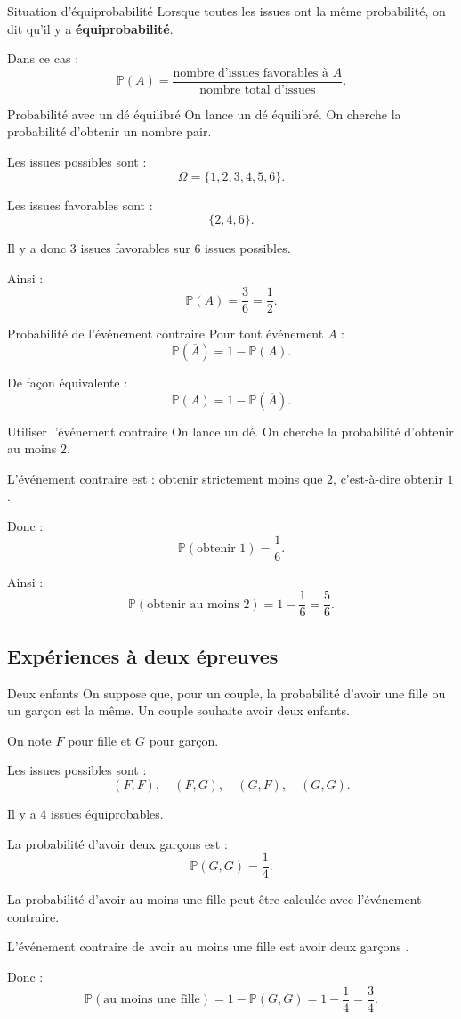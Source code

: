 \documentclass[11pt,a4paper]{article}
\newcommand{\Prob}{\mathbb{P}}
\begin{document}
\begin{propositionbox}{Situation d'équiprobabilité}
Lorsque toutes les issues ont la même probabilité, on dit qu'il y a \textbf{équiprobabilité}.

Dans ce cas :
\[
\Prob(A)=\frac{\text{nombre d'issues favorables à }A}{\text{nombre total d'issues}}.
\]
\end{propositionbox}

\begin{examplebox}{Probabilité avec un dé équilibré}
On lance un dé équilibré. On cherche la probabilité d'obtenir un nombre pair.

Les issues possibles sont :
\[
\Omega=\{1,2,3,4,5,6\}.
\]

Les issues favorables sont :
\[
\{2,4,6\}.
\]

Il y a donc $3$ issues favorables sur $6$ issues possibles.

Ainsi :
\[
\Prob(A)=\frac{3}{6}=\frac{1}{2}.
\]
\end{examplebox}

\begin{propositionbox}{Probabilité de l'événement contraire}
Pour tout événement $A$ :
\[
\Prob(\overline{A})=1-\Prob(A).
\]

De façon équivalente :
\[
\Prob(A)=1-\Prob(\overline{A}).
\]
\end{propositionbox}

\begin{examplebox}{Utiliser l'événement contraire}
On lance un dé. On cherche la probabilité d'obtenir au moins $2$.

L'événement contraire est : obtenir strictement moins que $2$, c'est-à-dire obtenir $1$.

Donc :
\[
\Prob(\text{obtenir }1)=\frac{1}{6}.
\]

Ainsi :
\[
\Prob(\text{obtenir au moins }2)=1-\frac{1}{6}=\frac{5}{6}.
\]
\end{examplebox}

\subsection{Expériences à deux épreuves}

\begin{examplebox}{Deux enfants}
On suppose que, pour un couple, la probabilité d'avoir une fille ou un garçon est la même. Un couple souhaite avoir deux enfants.

On note $F$ pour fille et $G$ pour garçon.

Les issues possibles sont :
\[
(F,F),\quad (F,G),\quad (G,F),\quad (G,G).
\]

Il y a $4$ issues équiprobables.

La probabilité d'avoir deux garçons est :
\[
\Prob(G,G)=\frac{1}{4}.
\]

La probabilité d'avoir au moins une fille peut être calculée avec l'événement contraire.

L'événement contraire de \og avoir au moins une fille \fg{} est \og avoir deux garçons \fg.

Donc :
\[
\Prob(\text{au moins une fille})=1-\Prob(G,G)=1-\frac{1}{4}=\frac{3}{4}.
\]
\end{examplebox}
\end{document}
